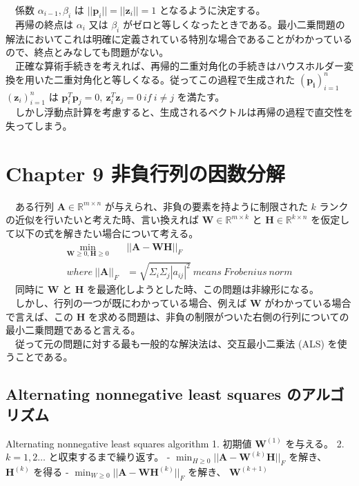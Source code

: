 \documentclass[a4paper,10pt]{jarticle}
\begin{document}
　係数 \(\alpha_{i-1}, \beta_i\) は \(||\bm{p}_i|| = ||\bm{z}_i||=1\) となるように決定する。\\

　再帰の終点は \(\alpha_i\) 又は \(\beta_i\) がゼロと等しくなったときである。最小二乗問題の解法においてこれは明確に定義されている特別な場合であることがわかっているので、終点とみなしても問題がない。\\
　正確な算術手続きを考えれば、再帰的二重対角化の手続きはハウスホルダー変換を用いた二重対角化と等しくなる。従ってこの過程で生成された \((\bm{p_i})^n_{i=1}\) \((\bm{z}_i)^n_{i=1}\) は \(\bm{p}_i^T\bm{p}_j=0 ,\ \bm{z}_i^T\bm{z}_j=0\ if\ i\neq j\) を満たす。\\
　しかし浮動点計算を考慮すると、生成されるベクトルは再帰の過程で直交性を失ってしまう。\\
\section{Chapter 9 非負行列の因数分解}
\label{sec:org21b7147}
　ある行列 \(\bm{A}\in\mathbb{R}^{m\times n}\) が与えられ、非負の要素を持ように制限された \(k\) ランクの近似を行いたいと考えた時、言い換えれば \(\bm{W}\in\mathbb{R}^{m\times k}\) と \(\bm{H}\in\mathbb{R}^{k\times n}\) を仮定して以下の式を解きたい場合について考える。\\
\begin{align*}
\min_{\bm{W}\geq 0, \bm{H}\geq 0}&||\bm{A}-\bm{W}\bm{H}||_F\\  \tag{7}
where\ ||\bm{A}||_F &= \sqrt{\Sigma_i\Sigma_j|a_{ij}|^2}\ means\ Frobenius\ norm
\end{align*}
　同時に \(\bm{W}\) と \(\bm{H}\) を最適化しようとした時、この問題は非線形になる。\\
　しかし、行列の一つが既にわかっている場合、例えば \(\bm{W}\) がわかっている場合で言えば、この \(\bm{H}\) を求める問題は、非負の制限がついた右側の行列についての最小二乗問題であると言える。\\
　従って元の問題に対する最も一般的な解決法は、交互最小二乗法 (ALS) を使うことである。\\
\subsection{Alternating nonnegative least squares のアルゴリズム}
\label{sec:org06de0d9}
\begin{itembox}[l]{Alternating nonnegative least squares algorithm}
1. 初期値 $\bm{W}^{(1)}$ を与える。
2. $k = 1 , 2 \dots$ と収束するまで繰り返す。
    - $\min_{H\geq0} ||\bm{A}-\bm{W}^{(k)}\bm{H}||_F$ を解き、 $\bm{H}^{(k)}$ を得る
    - $\min_{W\geq0} ||\bm{A}-\bm{W}\bm{H}^{(k)}||_F$ を解き、 $\bm{W}^{(k+1)}$
\end{itembox}
\end{document}
